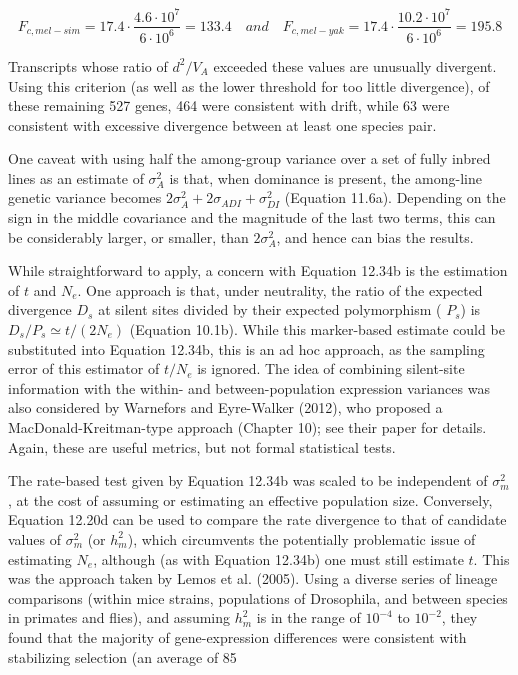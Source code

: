\documentclass{article}
\begin{document}
\begin{equation}
F_{c,mel-sim}=17.4\cdot\frac{4.6\cdot10^{7}}{6\cdot10^{6}}=133.4\quad and\quad F_{c,mel-yak}=17.4\cdot\frac{10.2\cdot10^{7}}{6\cdot10^{6}}=195.8
\end{equation}

Transcripts whose ratio of  $ d^{2}/V_{A} $ exceeded these values are unusually divergent. Using this criterion (as well as the lower threshold for too little divergence), of these remaining 527 genes, 464 were consistent with drift, while 63 were consistent with excessive divergence between at least one species pair.

One caveat with using half the among-group variance over a set of fully inbred lines as an estimate of  $ \sigma_A^2 $ is that, when dominance is present, the among-line genetic variance becomes  $ 2\sigma_A^2 + 2\sigma_{ADI} + \sigma_{DI}^2 $ (Equation 11.6a). Depending on the sign in the middle covariance and the magnitude of the last two terms, this can be considerably larger, or smaller, than  $ 2\sigma_A^2 $, and hence can bias the results.

While straightforward to apply, a concern with Equation 12.34b is the estimation of  $ t $ and  $ N_e $. One approach is that, under neutrality, the ratio of the expected divergence  $ D_s $ at silent sites divided by their expected polymorphism ( $ P_s $) is  $ D_s/P_s \simeq t/(2N_e) $ (Equation 10.1b). While this marker-based estimate could be substituted into Equation 12.34b, this is an ad hoc approach, as the sampling error of this estimator of  $ t/N_e $ is ignored. The idea of combining silent-site information with the within- and between-population expression variances was also considered by Warnefors and Eyre-Walker (2012), who proposed a MacDonald-Kreitman-type approach (Chapter 10); see their paper for details. Again, these are useful metrics, but not formal statistical tests.

The rate-based test given by Equation 12.34b was scaled to be independent of  $ \sigma_m^2 $, at the cost of assuming or estimating an effective population size. Conversely, Equation 12.20d can be used to compare the rate divergence to that of candidate values of  $ \sigma_m^2 $ (or  $ h_m^2 $), which circumvents the potentially problematic issue of estimating  $ N_e $, although (as with Equation 12.34b) one must still estimate  $ t $. This was the approach taken by Lemos et al. (2005). Using a diverse series of lineage comparisons (within mice strains, populations of Drosophila, and between species in primates and flies), and assuming  $ h_m^2 $ is in the range of  $ 10^{-4} $ to  $ 10^{-2} $, they found that the majority of gene-expression differences were consistent with stabilizing selection (an average of 85%
\end{document}
